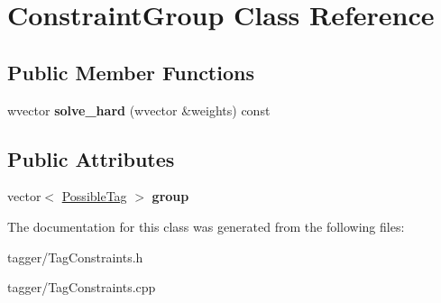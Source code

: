\hypertarget{classConstraintGroup}{
\section{ConstraintGroup Class Reference}
\label{classConstraintGroup}
}
\subsection*{Public Member Functions}
\begin{DoxyCompactItemize}
\item 
\hypertarget{classConstraintGroup_a4f37823a56e405c16148c0ba6ae7f114}{
wvector {\bfseries solve\_\-hard} (wvector \&weights) const }
\label{classConstraintGroup_a4f37823a56e405c16148c0ba6ae7f114}

\end{DoxyCompactItemize}
\subsection*{Public Attributes}
\begin{DoxyCompactItemize}
\item 
\hypertarget{classConstraintGroup_ac96c45d3b2c4c1a6e1068837bc024d9c}{
vector$<$ \hyperlink{structPossibleTag}{PossibleTag} $>$ {\bfseries group}}
\label{classConstraintGroup_ac96c45d3b2c4c1a6e1068837bc024d9c}

\end{DoxyCompactItemize}


The documentation for this class was generated from the following files:\begin{DoxyCompactItemize}
\item 
tagger/TagConstraints.h\item 
tagger/TagConstraints.cpp\end{DoxyCompactItemize}
